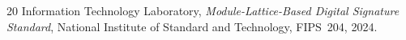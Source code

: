 \documentclass{llncs}
\begin{document}
\begin{thebibliography}{20}
Information Technology Laboratory,
\emph{Module-Lattice-Based Digital Signature Standard},
National Institute of Standard and Technology, FIPS~204, 2024.












\end{thebibliography}
\end{document}
